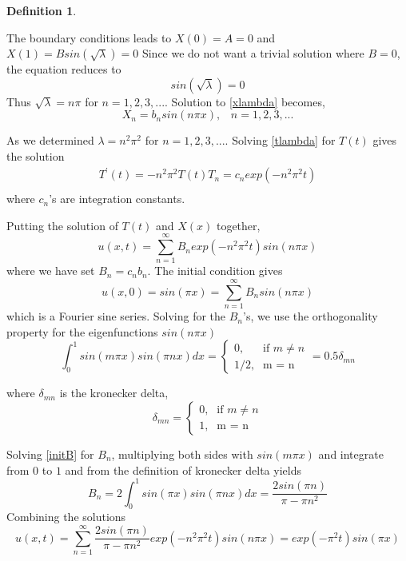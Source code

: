 \documentclass[12pt, oneside]{book}
\theoremstyle{plain}
\theoremstyle{definition}
\newtheorem{definition}[theorem]{Definition}
\begin{document}
\begin{definition}
\begin{itemize}
The boundary conditions leads to $
X(0) = A = 0$ and $ X(1) = Bsin(\sqrt{\lambda}) = 0 $
Since we do not want a trivial solution where $B = 0$, the equation reduces to 
\begin{equation}
sin(\sqrt{\lambda}) = 0
\end{equation} 
Thus $ \sqrt{\lambda} = n \pi $ for $n = 1,2,3, ...$. 
Solution to \ref{xlambda} becomes,
\begin{equation}
X_n = b_n sin(n \pi x), \hspace{10pt} n=1,2,3, ...
\end{equation}
\end{itemize}

As we determined $ \lambda = n^2 \pi^2 $ for $n = 1,2,3, ...$.  Solving \ref{tlambda} for $T(t)$ gives the solution
\begin{eqnarray}
T^{'}(t) = -n^2 \pi^2 T(t)
T_n = c_n exp(-n^2 \pi ^2 t) \\[10pt]
\end{eqnarray}
where $c_n$'s are integration constants.

Putting the solution of $T(t)$ and $X(x)$ together,
\begin{equation}
u(x,t) = \sum_{n=1}^{\infty} B_n exp(-n^2 \pi ^2 t) sin(n \pi x)
\end{equation}
where we have set $B_n = c_n b_n$. The initial condition gives
\begin{equation} \label{initB}
u(x,0) = sin(\pi x) = \sum_{n=1}^{\infty} B_n sin(n \pi x)
\end{equation}
which is a Fourier sine series.  Solving for the $B_n$’s, we use the orthogonality property for the eigenfunctions $sin(n \pi x)$ 
    \[ \int_{0}^{1} sin(m \pi x) sin(\pi n x) dx = \begin{cases} \mbox{0,} & \mbox{if } m \neq n \\ \mbox{1/2,} & \mbox{m = n} \end{cases} = 0.5 \delta _{mn} \]
    
where $ \delta _{mn}$ is the kronecker delta,  
\[  \delta _{mn} = \begin{cases} \mbox{0,} & \mbox{if } m \neq n \\ \mbox{1,} & \mbox{m = n} \end{cases} \]

Solving \ref{initB} for $B_n$, multiplying both sides with $sin(m \pi x)$ and integrate from $0$ to $1$ and from the definition of kronecker delta yields
\begin{equation}    
B_n = 2 \int_{0}^{1} sin(\pi x) sin(\pi n x) dx = \frac{2sin(\pi n)}{\pi - \pi n^2}
\end{equation}
Combining the solutions
\begin{equation}
u(x,t) = \sum_{n=1}^{\infty} \frac{2sin(\pi n)}{\pi - \pi n^2} exp(-n^2 \pi ^2 t) sin(n \pi x)= exp(-\pi^2 t) sin(\pi x) 
\end{equation}
\end{definition}
\end{document}
